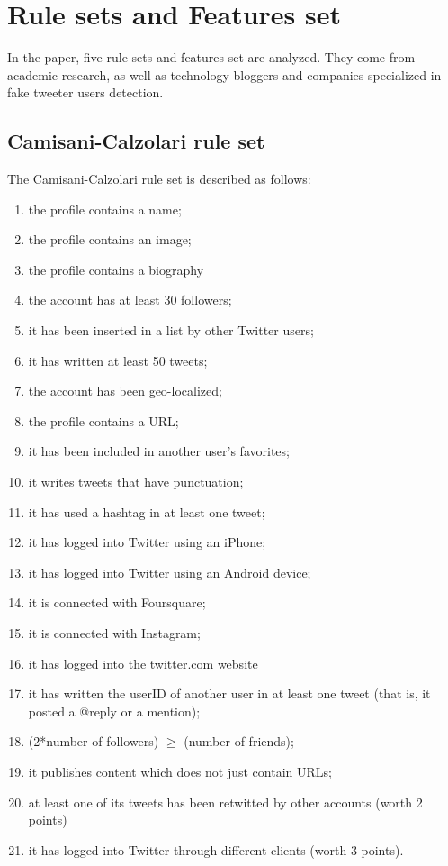 \documentclass[a4paper,11pt]{article}
\begin{document}
\section{Rule sets and Features set}
In the paper, five rule sets and features set are analyzed. They come from  academic research, as well as technology bloggers and companies specialized in fake tweeter users detection.\\



\subsection{Camisani-Calzolari rule set}
The Camisani-Calzolari rule set is described as follows:

\begin{multicols}{2}
\begin{enumerate}
\item the profile contains a name;
\item the profile contains an image;
\item the profile contains a biography
\item the account has at least 30 followers;
\item it has been inserted in a  list by other Twitter users;
\item it has written at least 50 tweets;
\item the account has been geo-localized;
\item the profile contains a URL;
\item it has been included in another user's favorites;
\item it writes tweets that have punctuation;
\item it has used a hashtag in at least one tweet;
\item it has logged into Twitter using an iPhone;
\item it has logged into Twitter using an Android device;
\item it is connected with Foursquare;
\item it is connected with Instagram;
\item it has logged into the twitter.com website
\item it has written the userID of another user in at least one tweet (that is, it posted a @reply or a mention);
\item (2*number of followers) $\geq$ (number of friends);
\item it publishes content which does not just contain URLs;
\item at least one of its tweets has been retwitted by other accounts (worth 2 points)
\item it has logged into Twitter through different clients (worth 3 points).
\end{enumerate}
\end{multicols}
\end{document}

